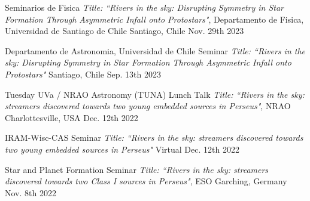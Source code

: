 


\begin{cvhonors}
	
	 \cvhonor
	{Seminarios de Fisica} %
	{\textit{Title: ``Rivers in the sky:  Disrupting Symmetry in Star Formation Through Asymmetric Infall onto Protostars"}, Departamento de Fisica, Universidad de Santiago de Chile} %
	{Santiago, Chile} %
	{Nov. 29th 2023} %
	
		 \cvhonor
	{Departamento de Astronomia, Universidad de Chile Seminar} %
	{\textit{Title: ``Rivers in the sky:  Disrupting Symmetry in Star Formation Through Asymmetric Infall onto Protostars"}} %
	{Santiago, Chile} %
	{Sep. 13th 2023} %
	
	 \cvhonor
	{Tuesday UVa / NRAO Astronomy (TUNA) Lunch Talk} %
	{\textit{Title: ``Rivers in the sky: streamers discovered towards two young embedded sources in Perseus"}, NRAO} %
	{Charlottesville, USA} %
	{Dec. 12th 2022} %
	
	 \cvhonor
	{IRAM-Wisc-CAS Seminar} %
	{\textit{Title: ``Rivers in the sky: streamers discovered towards two young embedded sources in Perseus"}} %
	{Virtual} %
	{Dec. 12th 2022} %
	
	 \cvhonor
	{Star and Planet Formation Seminar} %
	{\textit{Title: ``Rivers in the sky: streamers discovered towards two Class I sources in Perseus"}, ESO} %
	{Garching, Germany} %
	{Nov. 8th 2022} %
	
\end{cvhonors}


